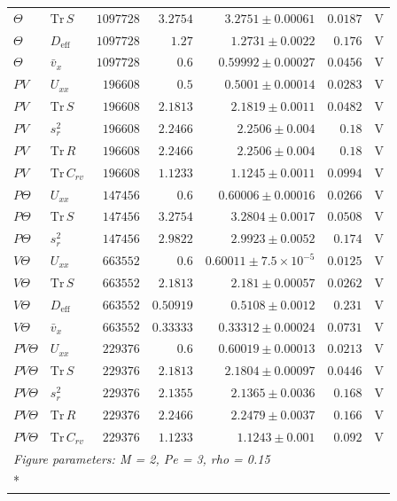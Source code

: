 \begin{longtable}{llrrrrc}
$\Theta$ & $\mathrm{Tr}\,S$ & $1097728$ & $3.2754$ & $3.2751 \pm 0.00061$ & $0.0187$ & V \\
$\Theta$ & $D_{\mathrm{eff}}$ & $1097728$ & $1.27$ & $1.2731 \pm 0.0022$ & $0.176$ & V \\
$\Theta$ & $\bar v_x$ & $1097728$ & $0.6$ & $0.59992 \pm 0.00027$ & $0.0456$ & V \\
$PV$ & $U_{xx}$ & $196608$ & $0.5$ & $0.5001 \pm 0.00014$ & $0.0283$ & V \\
$PV$ & $\mathrm{Tr}\,S$ & $196608$ & $2.1813$ & $2.1819 \pm 0.0011$ & $0.0482$ & V \\
$PV$ & $s_r^2$ & $196608$ & $2.2466$ & $2.2506 \pm 0.004$ & $0.18$ & V \\
$PV$ & $\mathrm{Tr}\,R$ & $196608$ & $2.2466$ & $2.2506 \pm 0.004$ & $0.18$ & V \\
$PV$ & $\mathrm{Tr}\,C_{rv}$ & $196608$ & $1.1233$ & $1.1245 \pm 0.0011$ & $0.0994$ & V \\
$P\Theta$ & $U_{xx}$ & $147456$ & $0.6$ & $0.60006 \pm 0.00016$ & $0.0266$ & V \\
$P\Theta$ & $\mathrm{Tr}\,S$ & $147456$ & $3.2754$ & $3.2804 \pm 0.0017$ & $0.0508$ & V \\
$P\Theta$ & $s_r^2$ & $147456$ & $2.9822$ & $2.9923 \pm 0.0052$ & $0.174$ & V \\
$V\Theta$ & $U_{xx}$ & $663552$ & $0.6$ & $0.60011 \pm 7.5\times10^{-5}$ & $0.0125$ & V \\
$V\Theta$ & $\mathrm{Tr}\,S$ & $663552$ & $2.1813$ & $2.181 \pm 0.00057$ & $0.0262$ & V \\
$V\Theta$ & $D_{\mathrm{eff}}$ & $663552$ & $0.50919$ & $0.5108 \pm 0.0012$ & $0.231$ & V \\
$V\Theta$ & $\bar v_x$ & $663552$ & $0.33333$ & $0.33312 \pm 0.00024$ & $0.0731$ & V \\
$PV\Theta$ & $U_{xx}$ & $229376$ & $0.6$ & $0.60019 \pm 0.00013$ & $0.0213$ & V \\
$PV\Theta$ & $\mathrm{Tr}\,S$ & $229376$ & $2.1813$ & $2.1804 \pm 0.00097$ & $0.0446$ & V \\
$PV\Theta$ & $s_r^2$ & $229376$ & $2.1355$ & $2.1365 \pm 0.0036$ & $0.168$ & V \\
$PV\Theta$ & $\mathrm{Tr}\,R$ & $229376$ & $2.2466$ & $2.2479 \pm 0.0037$ & $0.166$ & V \\
$PV\Theta$ & $\mathrm{Tr}\,C_{rv}$ & $229376$ & $1.1233$ & $1.1243 \pm 0.001$ & $0.092$ & V \\
\multicolumn{7}{l}{\textit{Figure parameters: M = 2, Pe = 3, rho = 0.15}} \\*

\end{longtable}
